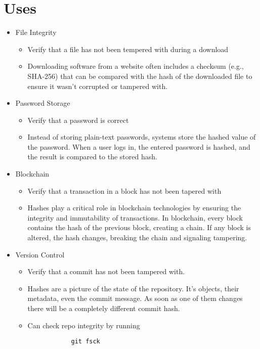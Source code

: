 
\section{Uses}

\begin{itemize}
    \item File Integrity
    \begin{itemize}
        \item Verify that a file has not been tempered with during a download
        \item Downloading software from a website often includes a checksum (e.g., SHA-256) that can be compared with the hash of the downloaded file to ensure it wasn’t corrupted or tampered with.
    \end{itemize}

    \item Password Storage
    \begin{itemize}
        \item Verify that a password is correct
        \item Instead of storing plain-text passwords, systems store the hashed value of the password. When a user logs in, the entered password is hashed, and the result is compared to the stored hash. 
    \end{itemize}

    \item Blockchain
    \begin{itemize}
        \item Verify that a transaction in a block has not been tapered with
        \item Hashes play a critical role in blockchain technologies by ensuring the integrity and immutability of transactions. In blockchain, every block contains the hash of the previous block, creating a chain. If any block is altered, the hash changes, breaking the chain and signaling tampering.
    \end{itemize}

    \item Version Control
    \begin{itemize}
        \item Verify that a commit has not been tampered with.
        \item Hashes are a picture of the state of the repository. It's objects, their metadata, even the commit message. As soon as one of them changes there will be a completely different commit hash.
        \item Can check repo integrity by running 

        \begin{lstlisting}
            git fsck
        \end{lstlisting}
    \end{itemize}
\end{itemize}